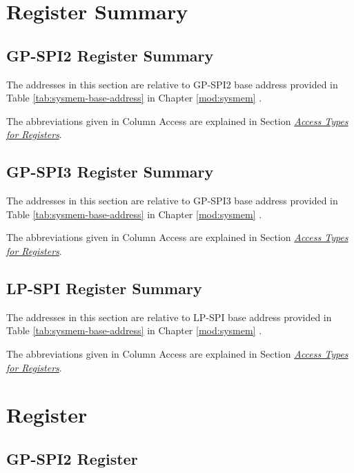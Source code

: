 \documentclass[main\_\_EN.tex]{subfiles}
\begin{document}
\hypertarget{spi-reg-summ}{}
\section{Register Summary}
\label{sec:spi-reg-summ}

\subsection{GP-SPI2 Register Summary}
\label{sec:spi2-reg-summ}
The addresses in this section are relative to GP-SPI2 base address provided in Table \ref{tab:sysmem-base-address} in Chapter \ref{mod:sysmem} \textit{}.

The abbreviations given in Column Access are explained in Section \hyperref[glossary-access-types]{\textit{Access Types for Registers}}.


\subsection{GP-SPI3 Register Summary}
\label{sec:spi3-reg-summ}
The addresses in this section are relative to GP-SPI3 base address provided in Table \ref{tab:sysmem-base-address} in Chapter \ref{mod:sysmem} \textit{}.

The abbreviations given in Column Access are explained in Section \hyperref[glossary-access-types]{\textit{Access Types for Registers}}.



\subsection{LP-SPI Register Summary}
\label{sec:lp-spi-reg-summ}
The addresses in this section are relative to LP-SPI base address provided in Table \ref{tab:sysmem-base-address} in Chapter \ref{mod:sysmem} \textit{}.

The abbreviations given in Column Access are explained in Section \hyperref[glossary-access-types]{\textit{Access Types for Registers}}.


\section{Register}

\subsection{GP-SPI2 Register}
\end{document}
